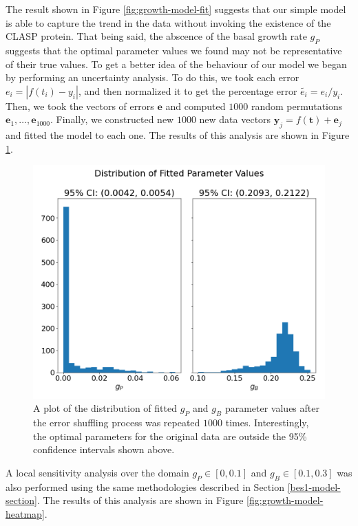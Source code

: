 \medskip

The result shown in Figure \ref{fig:growth-model-fit} suggests that our simple model is able to capture the trend in the data without invoking the existence of the CLASP protein. That being said, the abscence of the basal growth rate $g_{P}$ suggests that the optimal parameter values we found may not be representative of their true values. To get a better idea of the behaviour of our model we began by performing an uncertainty analysis. To do this, we  took each error $e_{i} = |f(t_{i}) - y_{i}|$, and then normalized it to get  the percentage error $\tilde{e_{i}} = e_{i} / y_{i}$. Then, we took the vectors of errors $\mathbf{e}$ and computed $1000$ random permutations $\mathbf{e}_{1}, \dots, \mathbf{e}_{1000}$. Finally, we constructed new $1000$ new data vectors $\mathbf{y}_{j} = f(\mathbf{t}) + \mathbf{e}_{j}$ and fitted the model to each one. The results of this analysis are shown in Figure \ref{fig:growth-model-uncertainty}.

\begin{figure}[!hbt]
    \centering
    \includegraphics[width=13cm]{img/growth-model-uncertainty.png}
    \caption{A plot of the distribution of fitted $g_{P}$ and $g_{B}$ parameter values after the error shuffling process was repeated $1000$ times. Interestingly, the optimal parameters for the original data are outside the 95\% confidence intervals shown above. }
    \label{fig:growth-model-uncertainty}
\end{figure}

\medskip

A local sensitivity analysis over the domain $g_{P} \in [0, 0.1]$ and $g_{B} \in [0.1, 0.3]$ was also performed using the same methodologies described in Section \ref{bes1-model-section}. The results of this analysis are shown in Figure \ref{fig:growth-model-heatmap}.

